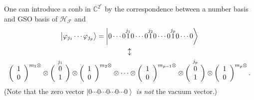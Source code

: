 \documentclass[aps,preprint]{revtex4}%
\begin{document}
One can introduce a conb in $\mathbb{C}^{2^{r}}$ by the correspondence between
a number basis and GSO basis of $\mathcal{H}_{\mathcal{F}}$ and
\begin{gather}
\left\vert \varphi_{j_{1}}\cdots\varphi_{j_{p}}\right\rangle =\left\vert
0\cdots0\overset{j_{1}}{1}0\cdots0\overset{j_{2}}{1}0\cdots0\overset{j_{p}%
}{1}0\cdots0\right\rangle \\
\updownarrow\\
\left(
\begin{array}
[c]{c}%
1\\
0
\end{array}
\right)  ^{m_{1}\otimes}\otimes\overset{j_{1}}{\left(
\begin{array}
[c]{c}%
0\\
1
\end{array}
\right)  }\otimes\left(
\begin{array}
[c]{c}%
1\\
0
\end{array}
\right)  ^{m_{2}\otimes}\otimes\cdots\otimes\left(
\begin{array}
[c]{c}%
1\\
0
\end{array}
\right)  ^{m_{p-1}\otimes}\otimes\overset{j_{p}}{\left(
\begin{array}
[c]{c}%
0\\
1
\end{array}
\right)  }\otimes\left(
\begin{array}
[c]{c}%
1\\
0
\end{array}
\right)  ^{m_{p}\otimes}.
\end{gather}
(Note that the zero vector $\left\vert 0\cdots0\cdots0\cdots0\cdots
0\right\rangle $ \emph{is not} the vacuum vector.)
\end{document}

